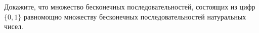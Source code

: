 Докажите, что множество бесконечных последовательностей, состоящих из цифр $\{0, 1\}$ равномощно
множеству бесконечных последовательностей натуральных чисел.
